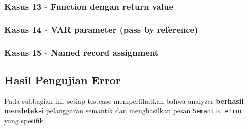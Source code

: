 \documentclass[11pt,a4paper]{article}
\begin{document}
\subsubsection*{Kasus 13 - Function dengan return value}





\subsubsection*{Kasus 14 - VAR parameter (pass by reference)}





\subsubsection*{Kasus 15 - Named record assignment}





\subsection{Hasil Pengujian Error}

Pada subbagian ini, setiap testcase memperlihatkan bahwa analyzer
\textbf{berhasil mendeteksi} pelanggaran semantik dan menghasilkan pesan
\texttt{Semantic error} yang spesifik.
\end{document}

